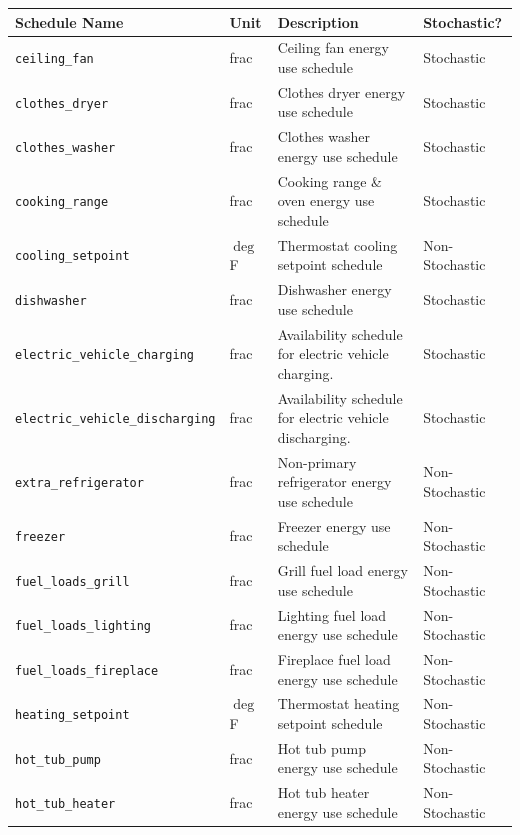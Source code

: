 \begin{table}
    \centering
    \scriptsize
    \begin{tabular}{l|l|l|l}
    \hline
    Schedule Name & Unit & Description & Stochastic? \\
    \hline
    \texttt{ceiling\_fan} & frac & Ceiling fan energy use schedule & Stochastic \\
    \texttt{clothes\_dryer} & frac & Clothes dryer energy use schedule & Stochastic \\
    \texttt{clothes\_washer} & frac & Clothes washer energy use schedule & Stochastic \\
    \texttt{cooking\_range} & frac & Cooking range \& oven energy use schedule & Stochastic \\
    \texttt{cooling\_setpoint} & $\deg$ F & Thermostat cooling setpoint schedule & Non-Stochastic \\
    \texttt{dishwasher} & frac & Dishwasher energy use schedule & Stochastic \\
    \texttt{electric\_vehicle\_charging} & frac & Availability schedule for electric vehicle charging. & Stochastic \\
    \texttt{electric\_vehicle\_discharging} & frac & Availability schedule for electric vehicle discharging. & Stochastic \\
    \texttt{extra\_refrigerator} & frac & Non-primary refrigerator energy use schedule & Non-Stochastic \\
    \texttt{freezer} & frac & Freezer energy use schedule & Non-Stochastic \\
    \texttt{fuel\_loads\_grill} & frac & Grill fuel load energy use schedule & Non-Stochastic \\
    \texttt{fuel\_loads\_lighting} & frac & Lighting fuel load energy use schedule & Non-Stochastic \\
    \texttt{fuel\_loads\_fireplace} & frac & Fireplace fuel load energy use schedule & Non-Stochastic \\
    \texttt{heating\_setpoint} & $\deg$ F & Thermostat heating setpoint schedule & Non-Stochastic \\
    \texttt{hot\_tub\_pump} & frac & Hot tub pump energy use schedule & Non-Stochastic \\
    \texttt{hot\_tub\_heater} & frac & Hot tub heater energy use schedule & Non-Stochastic \\

\end{tabular}
\end{table}
